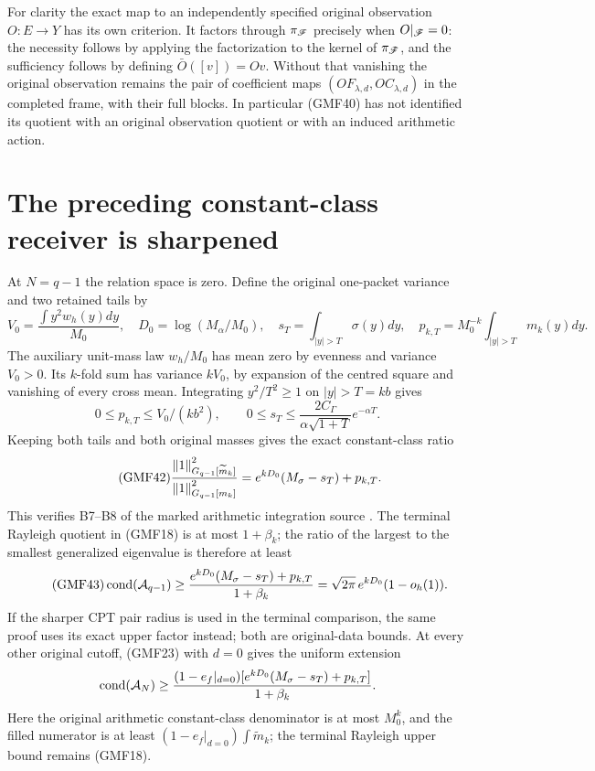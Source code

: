 \documentclass[11pt,a4paper]{article}
\begin{document}
For clarity the exact map to an independently specified
original observation \(O:E\to Y\) has its own criterion.
It factors through \(\pi_\mathscr F\) precisely when
\(O|_\mathscr F=0\): the necessity follows by applying the
factorization to the kernel of \(\pi_\mathscr F\), and the
sufficiency follows by defining \(\bar O([v])=Ov\).
Without that vanishing the original observation remains
the pair of coefficient maps
\((OF_{\lambda,d},OC_{\lambda,d})\) in the completed frame,
with their full blocks.  In particular (GMF40) has not
identified its quotient with an original observation
quotient or with an induced arithmetic action.

\section{The preceding constant-class receiver is sharpened}

At \(N=q-1\) the relation space is zero.  Define the original
one-packet variance and two retained tails by
\[
 V_0=\frac{\int y^2w_h(y)dy}{M_0},\quad
 D_0=\log(M_\alpha/M_0),\quad
 s_T=\int_{|y|>T}\sigma(y)dy,\quad
 p_{k,T}=M_0^{-k}\int_{|y|>T}m_k(y)dy.
\]
The auxiliary unit-mass law \(w_h/M_0\) has mean zero by
evenness and variance \(V_0>0\).
Its \(k\)-fold sum has variance \(kV_0\), by expansion of
the centred square and vanishing of every cross mean.
Integrating \(y^2/T^2\ge1\) on \(|y|>T=kb\) gives
\[
 0\le p_{k,T}\le V_0/(kb^2),\qquad
 0\le s_T\le
 \frac{2C_\Gamma}{\alpha\sqrt{1+T}}e^{-\alpha T}.
\]
Keeping both tails and both original masses gives the
exact constant-class ratio
\begin{equation}\tag{GMF42}
 \frac{\left\lVert1\right\rVert_{G_{q-1}[\widetilde m_k]}^2}
      {\left\lVert1\right\rVert_{G_{q-1}[m_k]}^2}
 =e^{kD_0}(M_\sigma-s_T)+p_{k,T}.
\end{equation}
This verifies B7--B8 of the marked arithmetic integration
source \cite{a02gmf:markedProvider}.
The terminal Rayleigh quotient in (GMF18) is at most
\(1+\beta_k\); the ratio of the largest to the smallest
generalized eigenvalue is therefore at least
\begin{equation}\tag{GMF43}
 \operatorname{cond}(\mathcal A_{q-1})
 \ge\frac{e^{kD_0}(M_\sigma-s_T)+p_{k,T}}{1+\beta_k}
 =\sqrt{2\pi}\,e^{kD_0}(1-o_h(1)).
\end{equation}
If the sharper CPT pair radius is used in the terminal
comparison, the same proof uses its exact upper factor
instead; both are original-data bounds.
At every other original cutoff, (GMF23) with \(d=0\)
gives the uniform extension
\[
 \operatorname{cond}(\mathcal A_N)\ge
 \frac{(1-e_f|_{d=0})
       [e^{kD_0}(M_\sigma-s_T)+p_{k,T}]}
      {1+\beta_k}.
\]
Here the original arithmetic constant-class denominator
is at most \(M_0^k\), and the filled numerator is at least
\((1-e_f|_{d=0})\int\widetilde m_k\); the terminal
Rayleigh upper bound remains (GMF18).
\end{document}
